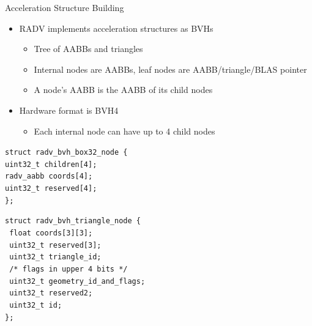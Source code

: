 \documentclass[aspectratio=169,t]{beamer}
\begin{document}
\begin{slide}{Acceleration Structure Building}
 \begin{itemize}
  \item RADV implements acceleration structures as BVHs
  \begin{itemize}
    \item Tree of AABBs and triangles
    \item Internal nodes are AABBs, leaf nodes are AABB/triangle/BLAS pointer
    \item A node's AABB is the AABB of its child nodes
  \end{itemize}
  \item Hardware format is BVH4
  \begin{itemize}
    \item Each internal node can have up to 4 child nodes
  \end{itemize}
 \end{itemize}

 \begin{minipage}[t]{0.45\textwidth}
\texttt{struct radv\_bvh\_box32\_node \{\\
\hspace*{8pt} uint32\_t children[4];\\
\hspace*{8pt} radv\_aabb coords[4];\\
\hspace*{8pt} uint32\_t reserved[4];\\
\};}
 \end{minipage}
 \begin{minipage}[t]{0.5\textwidth}
\texttt{struct radv\_bvh\_triangle\_node \{}\\
\texttt{\hspace*{8pt} float coords[3][3];}\\
\texttt{\hspace*{8pt} uint32\_t reserved[3];}\\
\texttt{\hspace*{8pt} uint32\_t triangle\_id;}\\
\texttt{\hspace*{8pt} /* flags in upper 4 bits */}\\
\texttt{\hspace*{8pt} uint32\_t geometry\_id\_and\_flags;}\\
\texttt{\hspace*{8pt} uint32\_t reserved2;}\\
\texttt{\hspace*{8pt} uint32\_t id;}\\
\texttt{\};}
 \end{minipage}
\end{slide}
\end{document}
